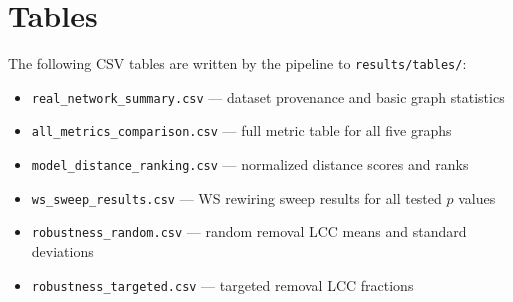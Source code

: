 \documentclass[12pt,a4paper]{report}
\begin{document}
\section{Tables}

The following CSV tables are written by the pipeline to \texttt{results/tables/}:

\begin{itemize}
    \item \texttt{real\_network\_summary.csv} — dataset provenance and basic graph statistics
    \item \texttt{all\_metrics\_comparison.csv} — full metric table for all five graphs
    \item \texttt{model\_distance\_ranking.csv} — normalized distance scores and ranks
    \item \texttt{ws\_sweep\_results.csv} — WS rewiring sweep results for all tested $p$ values
    \item \texttt{robustness\_random.csv} — random removal LCC means and standard deviations
    \item \texttt{robustness\_targeted.csv} — targeted removal LCC fractions
\end{itemize}
\end{document}
